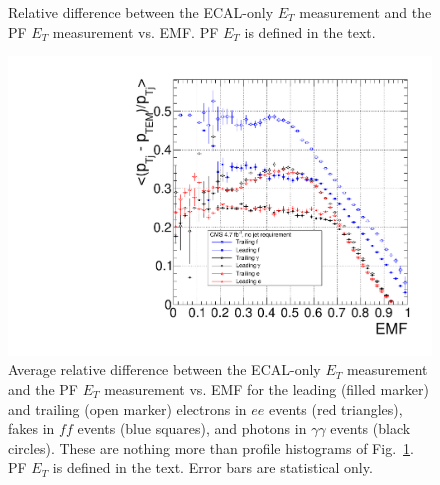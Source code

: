 \documentclass[dissertation_bw.tex]{subfiles}
\begin{document}
\begin{figure}
	\caption{Relative difference between the ECAL-only $E_{T}$ measurement and the PF $E_{T}$ measurement vs. EMF.  PF $E_{T}$ is defined in the text.}
	\label{fig:ET_bias_vs_EMF}
\end{figure}

\begin{figure}
	\centering
	\includegraphics[scale=0.5]{4684pb-1_single_ETBias}
	\caption{Average relative difference between the ECAL-only $E_{T}$ measurement and the PF $E_{T}$ measurement vs. EMF for the leading (filled marker) and trailing (open marker) electrons in $ee$ events (red triangles), fakes in $\mathit{ff}$ events (blue squares), and photons in $\gamma\gamma$ events (black circles).  These are nothing more than profile histograms of Fig.~\ref{fig:ET_bias_vs_EMF}.  PF $E_{T}$ is defined in the text.  Error bars are statistical only.}
	\label{fig:4684pb-1_single_ETBias}
\end{figure}
\end{document}

